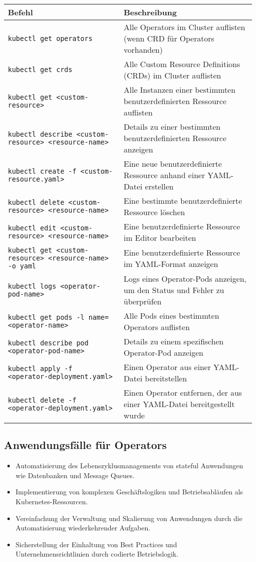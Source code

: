 \noindent
\begin{tabular}{|p{}|p{}|}
\hline
\textbf{Befehl} & \textbf{Beschreibung} \\
\hline
\texttt{kubectl get operators} & Alle Operators im Cluster auflisten (wenn CRD für Operators vorhanden) \\
\texttt{kubectl get crds} & Alle Custom Resource Definitions (CRDs) im Cluster auflisten \\
\texttt{kubectl get <custom-resource>} & Alle Instanzen einer bestimmten benutzerdefinierten Ressource auflisten \\
\texttt{kubectl describe <custom-resource> <resource-name>} & Details zu einer bestimmten benutzerdefinierten Ressource anzeigen \\
\texttt{kubectl create -f <custom-resource.yaml>} & Eine neue benutzerdefinierte Ressource anhand einer YAML-Datei erstellen \\
\texttt{kubectl delete <custom-resource> <resource-name>} & Eine bestimmte benutzerdefinierte Ressource löschen \\
\texttt{kubectl edit <custom-resource> <resource-name>} & Eine benutzerdefinierte Ressource im Editor bearbeiten \\
\texttt{kubectl get <custom-resource> <resource-name> -o yaml} & Eine benutzerdefinierte Ressource im YAML-Format anzeigen \\
\texttt{kubectl logs <operator-pod-name>} & Logs eines Operator-Pods anzeigen, um den Status und Fehler zu überprüfen \\
\texttt{kubectl get pods -l name=<operator-name>} & Alle Pods eines bestimmten Operators auflisten \\
\texttt{kubectl describe pod <operator-pod-name>} & Details zu einem spezifischen Operator-Pod anzeigen \\
\texttt{kubectl apply -f <operator-deployment.yaml>} & Einen Operator aus einer YAML-Datei bereitstellen \\
\texttt{kubectl delete -f <operator-deployment.yaml>} & Einen Operator entfernen, der aus einer YAML-Datei bereitgestellt wurde \\
\hline
\end{tabular}

\subsection{Anwendungsfälle für Operators}
\begin{itemize}
    \item Automatisierung des Lebenszyklusmanagements von stateful Anwendungen wie Datenbanken und Message Queues.
    \item Implementierung von komplexen Geschäftslogiken und Betriebsabläufen als Kubernetes-Ressourcen.
    \item Vereinfachung der Verwaltung und Skalierung von Anwendungen durch die Automatisierung wiederkehrender Aufgaben.
    \item Sicherstellung der Einhaltung von Best Practices und Unternehmensrichtlinien durch codierte Betriebslogik.
\end{itemize}

